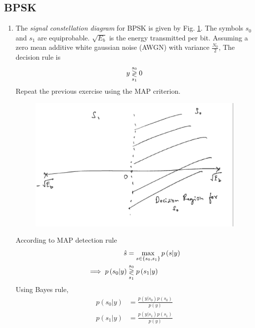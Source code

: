 \documentclass[10pt, a4paper]{article}
\providecommand{\brak}[1]{\ensuremath{\left(#1\right)}}
\begin{document}
\subsection{BPSK}
\begin{enumerate}
\item 
The {\em signal constellation diagram} for BPSK is given by Fig. \ref{fig:bpsk_const}.  The symbols $s_0$ and $s_1$ are equiprobable.  $\sqrt{E_b}$ is the energy transmitted per bit. Assuming a zero mean additive white gaussian noise (AWGN) with variance $\frac{N_0}{2}$,
The decision rule is
\begin{equation}
y \overset{s_0}{\underset{s_1}{\gtrless}} 0
\end{equation}
Repeat the previous exercise using the MAP criterion.

%
\begin{figure}[!h]
\centering
\includegraphics[width=\columnwidth]{images/bpsk.eps}
\caption{}
\label{fig:bpsk_const}
\end{figure}
\solution
According to MAP detection rule
\begin{align}
    \hat{s} &= \max_{s \in  \cbrak{s_0,s_1}} p\brak{s|y}
    \label{eq:ee18btech11042_3}
\\
    \implies p\brak{s_0|y} &\dec{s_0}{s_1} p\brak{s_1|y}
    \label{eq:ee18btech11042_4}
\end{align}
Using Bayes rule,
\begin{align}
    p\brak{s_0|y} &= \frac{p\brak{y|s_0}p\brak{s_0}}{p\brak{y}}
    \label{eq:ee18btech11042_5}
\\
    p\brak{s_1|y} &= \frac{p\brak{y|s_1}p\brak{s_1}}{p\brak{y}}
    \label{eq:ee18btech11042_6}
\end{align}

\end{enumerate}
\end{document}
